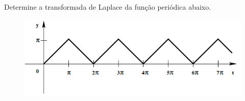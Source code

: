 \linespread{1.5}
Determine a transformada de Laplace da função periódica abaixo.
\begin{figure}[H]
    \centering
    \includegraphics[width=0.5\linewidth]{fig/func1.png}
\end{figure}